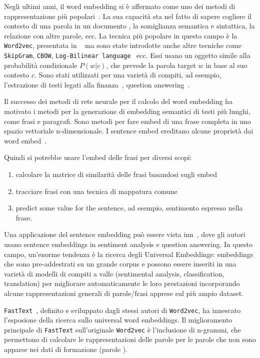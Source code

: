Negli ultimi anni, il word embedding si è affermato come uno dei metodi di rappresentazione più popolari~\cite{bengio2003neural,collobert2008unified,turian2010word}.
La sua capacità sta nel fatto di sapere cogliere il contesto di una parola in un documento , la somiglianza semantica e sintattica, la relazione con altre parole, ecc. La tecnica più popolare in questo campo è la {\tt Word2vec}, presentata in ~\cite{mikolov2013efficient,mikolov2013distributed} ma sono state introdotte anche altre tecniche come {\tt SkipGram}, {\tt CBOW}, {\tt Log-Bilinear language}~\cite{mnih2007three} ecc. Essi usano un oggetto simile alla probabilità condizionale $P(w|c)$, che prevede la parola target $w$ in base al suo contesto $c$. Sono stati utilizzati per una varietà di compiti, ad esempio, l'estrazione di testi legati alla finanza~\cite{wang2019user}, question answering~\cite{yang2019online}.

Il successo dei metodi di rete neurale per il calcolo del word embedding ha motivato i metodi per la generazione di embedding semantici di testi più lunghi, come frasi e paragrafi. Sono metodi per fare embed di una frase completa in uno spazio vettoriale n-dimensionale. I sentence embed ereditano alcune proprietà dai word embed~\cite{arora2016simple}.

Quindi si potrebbe usare l'embed delle frasi per diversi scopi:
\begin{enumerate}
    \item calcolare la matrice di similarità delle frasi basandosi sugli embed
    \item tracciare frasi con una tecnica di mappatura comune
    \item predict some value for the sentence, ad esempio, sentimento espresso nella frase.
\end{enumerate}
Una applicazione del sentence embedding può essere vista inn~\cite{iyyer2015deep}, dove gli autori usano sentence embeddings in sentiment analysis e question answering. In questo campo, un'enorme tendenza è la ricerca degli Universal Embeddings: embeddings che sono pre-addestrati su un grande corpus e possono essere inseriti in una varietà di modelli di compiti a valle (sentimental analysis, classification, translation) per migliorare automaticamente le loro prestazioni incorporando alcune rappresentazioni generali di parole/frasi apprese sul più ampio dataset.

{\tt FastText}~\cite{joulin2016fasttext}, definito e sviluppato dagli stessi autori di {\tt Word2vec}, ha innescato l'esposione della ricerca sullo universal word embeddings. Il miglioramento principale di {\tt FastText} sull'originale {\tt Word2vec} è l'inclusione di n-grammi, che permettono di calcolare le rappresentazioni delle parole per le parole che non sono apparse nei dati di formazione (parole ).

